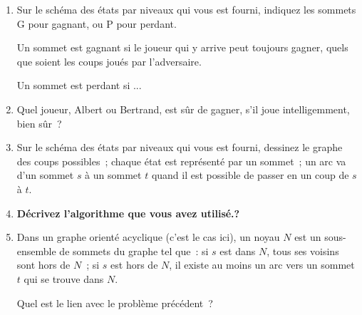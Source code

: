 \documentclass[11pt]{article}
\begin{document}
 \begin{enumerate}
\item  Sur le schéma des états par niveaux qui vous est fourni, indiquez  les sommets G pour gagnant, ou P pour perdant.

Un sommet est gagnant si le joueur qui y arrive peut toujours gagner, quels que soient les coups joués par l'adversaire.

Un sommet est perdant si ...

\item  Quel joueur, Albert ou Bertrand, est sûr de gagner, s'il joue intelligemment, bien sûr~?

\item Sur le schéma des états par niveaux qui vous est fourni, dessinez le graphe des coups possibles~; chaque état  est représenté par un sommet~; un arc va d'un sommet $s$ à un sommet $t$ quand il est possible de passer en un coup de $s$ à $t$. 


\item  \textbf{Décrivez l'algorithme que vous avez utilisé.?}


\item  Dans un graphe orienté acyclique (c'est le cas ici), un noyau $N$ est 
un sous-ensemble de sommets du graphe tel que~: si $s$ est dans $N$, tous ses voisins sont hors de $N$~; si $s$ est hors de $N$, il existe au moins un arc vers un sommet $t$ qui se trouve dans $N$. 

Quel est le lien avec le problème précédent~? 

\end{enumerate}
\end{document}
